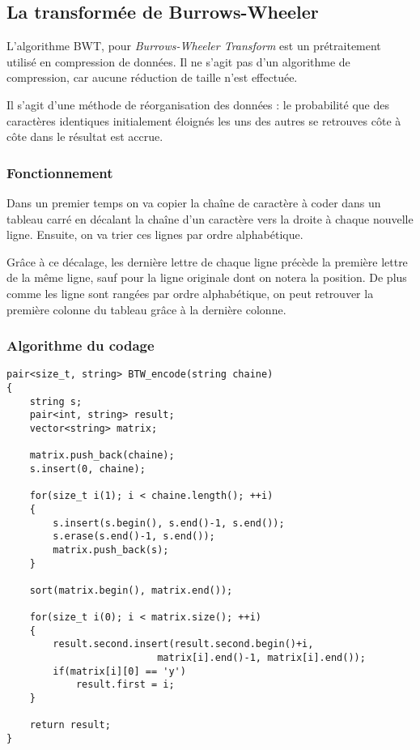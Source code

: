 \subsection{La transformée de Burrows-Wheeler}

\par L'algorithme BWT, pour \textit{Burrows-Wheeler Transform} est un prétraitement utilisé en compression de données. Il ne s'agit pas d'un algorithme de compression, car aucune réduction de taille n'est effectuée. 
\par Il s'agit d'une méthode de réorganisation des données : le probabilité que des caractères identiques initialement éloignés les uns des autres se retrouves côte à côte dans le résultat est accrue.


\subsubsection{Fonctionnement}
\par Dans un premier temps on va copier la chaîne de caractère à coder dans un tableau carré en décalant la chaîne d'un caractère vers la droite à chaque nouvelle ligne. Ensuite, on va trier ces lignes par ordre alphabétique.
\par Grâce à ce décalage, les dernière lettre de chaque ligne précède la première lettre de la même ligne, sauf pour la ligne originale dont on notera la position. De plus comme les ligne sont rangées par ordre alphabétique, on peut retrouver la première colonne du tableau grâce à la dernière colonne.\\

\subsubsection{Algorithme du codage}
\begin{verbatim}
pair<size_t, string> BTW_encode(string chaine)
{
	string s;
	pair<int, string> result;
	vector<string> matrix;
	
	matrix.push_back(chaine);
	s.insert(0, chaine);
	
	for(size_t i(1); i < chaine.length(); ++i)
	{
		s.insert(s.begin(), s.end()-1, s.end());
		s.erase(s.end()-1, s.end());
		matrix.push_back(s);
	}
	
	sort(matrix.begin(), matrix.end());
	
	for(size_t i(0); i < matrix.size(); ++i)
	{
		result.second.insert(result.second.begin()+i, 
		                  matrix[i].end()-1, matrix[i].end());
		if(matrix[i][0] == 'y')
			result.first = i;
	}
	
	return result;	
}
\end{verbatim}


